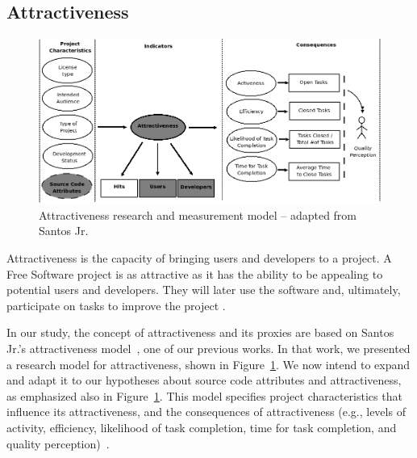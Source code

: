 \documentclass[conference]{IEEEtran}
\begin{document}
\subsection{Attractiveness} 
\label{attract}

\begin{figure}[!t]
\centering
\includegraphics[scale=.45]{figure/attractiveness3}
\caption{Attractiveness research and measurement model
-- adapted from Santos Jr.~\cite{Santos2010}}
\label{attractiveness}
\end{figure}

Attractiveness is the capacity of bringing users and developers to a project.
%
A Free Software project is as attractive as it has the ability to be appealing
to potential users and developers.
%
They will later use the software and, ultimately, participate on tasks to
improve the project \cite{Santos2010}.

In our study, the concept of attractiveness and its proxies are
based on Santos Jr.'s attractiveness model~\cite{Santos2010},
one of our previous works.
%
In that work, we presented a research model for attractiveness,
shown in Figure~\ref{attractiveness}. We now intend to expand and 
adapt it to our hypotheses about source code attributes and attractiveness,
as emphasized also in Figure~\ref{attractiveness}.
%
This model specifies project characteristics that influence its attractiveness,
and the consequences of attractiveness (e.g., levels of activity, efficiency, 
likelihood of task completion, time for task completion, 
and quality perception)~\cite{Santos2010}.
\end{document}
